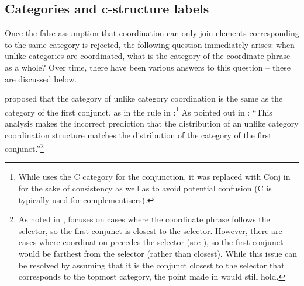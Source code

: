 \documentclass[output=paper]{../langscibook}
\begin{document}
\subsection{Categories and c-structure labels}
\label{sec:Coordination:unlikes:label}

Once the false assumption that coordination can only join
elements corresponding to the same category is rejected, the following
question immediately arises: when unlike categories are coordinated,
what is the category of the coordinate phrase as a whole? Over time,
there have been various answers to this question – these are discussed
below.

\citet{pete:04} proposed that the category of unlike category
coordination is the same as the category of the first conjunct, as in
the rule in :\footnote{While \citet{pete:04}
  uses the C category for the conjunction, it was replaced with Conj
  in  for the sake of consistency as well as to avoid
  potential confusion (C is typically used for complementisers).}
\ea\label{ex:pete:04:20}
\hfill\citep[(20)]{pete:04}
\z
As pointed out in \citet[38]{dalr:17}: ``This analysis makes the
incorrect prediction that the distribution of an unlike category
coordination structure matches the distribution of the category of the
first conjunct.''\footnote{As noted in \citet{bru:kha:20},
\citet{pete:04} focuses on cases where the coordinate phrase follows
the selector, so the first conjunct is closest to the selector. However,
there are cases where coordination precedes the selector (see ), so the
first conjunct would be farthest from the selector (rather than
closest). While this issue can be resolved by assuming
that it is the conjunct closest to the selector that corresponds to
the topmost category, the point made in \citet{dalr:17} would still
hold.}
\end{document}
